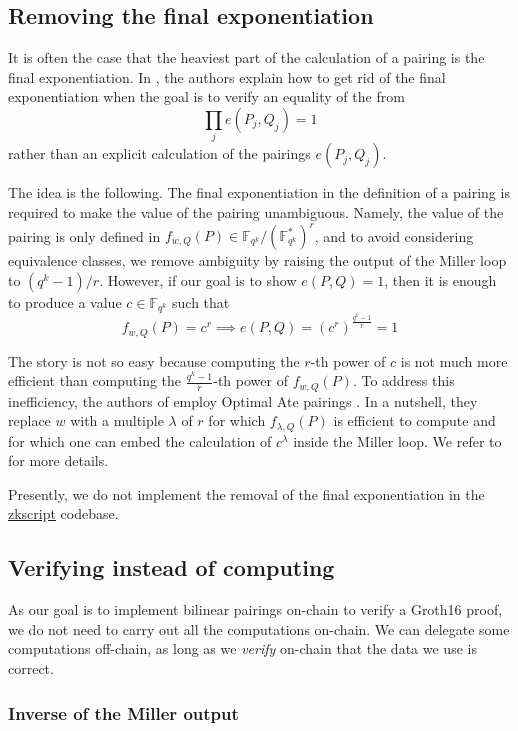 \documentclass{article}
\newcommand{\fq}[1]{\mathbb{F}_{q^{#1}}}
\theoremstyle{remark}
\theoremstyle{plain}
\begin{document}
\subsection{Removing the final exponentiation}

It is often the case that the heaviest part of the calculation of a pairing is the final exponentiation.
In \cite{NE-on-proving-pairings}, the authors explain how to get rid of the final exponentiation when the goal is to verify an equality of the from
\[
    \prod_j e(P_j,Q_j) = 1
\]
rather than an explicit calculation of the pairings $e(P_j,Q_j)$.

The idea is the following.
The final exponentiation in the definition of a pairing is required to make the value of the pairing unambiguous.
Namely, the value of the pairing is only defined in $f_{w,Q}(P) \in \fq{k} / (\fq{k}^\ast)^r$, and to avoid considering equivalence classes, we remove ambiguity by raising the output of the Miller loop to $(q^k-1)/r$.
However, if our goal is to show $e(P,Q) = 1$, then it is enough to produce a value $c \in \fq{k}$ such that
\[
    f_{w,Q}(P) = c^r \implies e(P,Q) = (c^r)^{\frac{q^k-1}{r}} = 1
\]

The story is not so easy because computing the $r$-th power of $c$ is not much more efficient than computing the $\frac{q^k-1}{r}$-th power of $f_{w,Q}(P)$.
To address this inefficiency, the authors of \cite{NE-on-proving-pairings} employ Optimal Ate pairings \cite{V-optimal-ate-pairings}.
In a nutshell, they replace $w$ with a multiple $\lambda$ of $r$ for which $f_{\lambda,Q}(P)$ is efficient to compute and for which one can embed the calculation of $c^{\lambda}$ inside the Miller loop.
We refer to \cite{NE-on-proving-pairings} for more details.

Presently, we do not implement the removal of the final exponentiation in the \href{https://github.com/nchain-innovation/zkscript_package}{zkscript} codebase.

\subsection{Verifying instead of computing}

As our goal is to implement bilinear pairings on-chain to verify a Groth16 proof, we do not need to carry out all the computations on-chain.
We can delegate some computations off-chain, as long as we \emph{verify} on-chain that the data we use is correct.

\subsubsection{Inverse of the Miller output}
\label{subsubsect:inverseMillerOutput}
\end{document}
